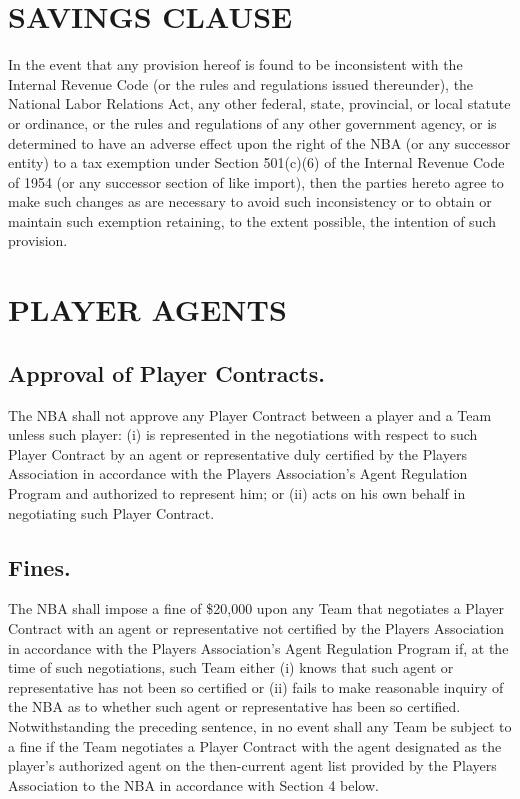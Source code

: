 \documentclass[
]{book}
\begin{document}
\hypertarget{savings-clause}{%
\chapter{SAVINGS CLAUSE}\label{savings-clause}}

In the event that any provision hereof is found to be inconsistent with the Internal Revenue Code (or the rules and regulations issued thereunder), the National Labor Relations Act, any other federal, state, provincial, or local statute or ordinance, or the rules and regulations of any other government agency, or is determined to have an adverse effect upon the right of the NBA (or any successor entity) to a tax exemption under Section 501(c)(6) of the Internal Revenue Code of 1954 (or any successor section of like import), then the parties hereto agree to make such changes as are necessary to avoid such inconsistency or to obtain or maintain such exemption retaining, to the extent possible, the intention of such provision.

\hypertarget{player-agents}{%
\chapter{PLAYER AGENTS}\label{player-agents}}

\hypertarget{approval-of-player-contracts.}{%
\section{Approval of Player Contracts.}\label{approval-of-player-contracts.}}

The NBA shall not approve any Player Contract between a player and a Team unless such player: (i) is represented in the negotiations with respect to such Player Contract by an agent or representative duly certified by the Players Association in accordance with the Players Association's Agent Regulation Program and authorized to represent him; or (ii) acts on his own behalf in negotiating such Player Contract.

\hypertarget{fines.}{%
\section{Fines.}\label{fines.}}

The NBA shall impose a fine of \$20,000 upon any Team that negotiates a Player Contract with an agent or representative not certified by the Players Association in accordance with the Players Association's Agent Regulation Program if, at the time of such negotiations, such Team either (i) knows that such agent or representative has not been so certified or (ii) fails to make reasonable inquiry of the NBA as to whether such agent or representative has been so certified. Notwithstanding the preceding sentence, in no event shall any Team be subject to a fine if the Team negotiates a Player Contract with the agent designated as the player's authorized agent on the then-current agent list provided by the Players Association to the NBA in accordance with Section 4 below.
\end{document}
